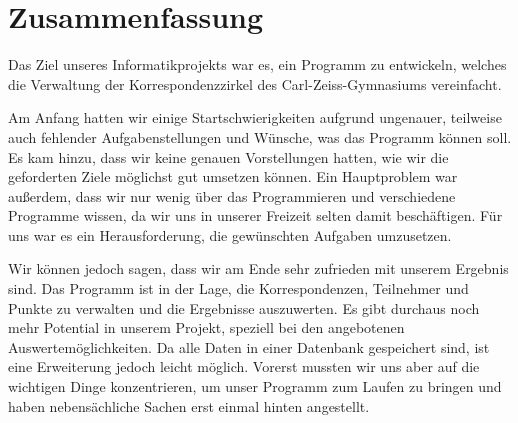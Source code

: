 \chapter{Zusammenfassung}
Das Ziel unseres Informatikprojekts war es, ein Programm zu entwickeln, welches die Verwaltung der Korrespondenzzirkel des Carl-Zeiss-Gymnasiums vereinfacht.
 
Am Anfang hatten wir einige Startschwierigkeiten aufgrund ungenauer, teilweise auch fehlender Aufgabenstellungen und Wünsche, was das Programm können soll. Es kam hinzu, dass wir keine genauen Vorstellungen hatten, wie wir die geforderten Ziele möglichst gut umsetzen können. Ein Hauptproblem war außerdem, dass wir nur wenig über das Programmieren und verschiedene Programme wissen, da wir uns in unserer Freizeit selten damit beschäftigen. Für uns war es ein Herausforderung, die gewünschten Aufgaben umzusetzen.

Wir können jedoch sagen, dass wir am Ende sehr zufrieden mit unserem Ergebnis sind. Das Programm ist in der Lage, die Korrespondenzen, Teilnehmer und Punkte zu verwalten und die Ergebnisse auszuwerten. Es gibt durchaus noch mehr Potential in unserem Projekt, speziell bei den angebotenen Auswertemöglichkeiten. Da alle Daten in einer Datenbank gespeichert sind, ist eine Erweiterung jedoch leicht möglich. Vorerst mussten wir uns aber auf die wichtigen Dinge konzentrieren, um unser Programm zum Laufen zu bringen und haben nebensächliche Sachen erst einmal hinten angestellt. 
